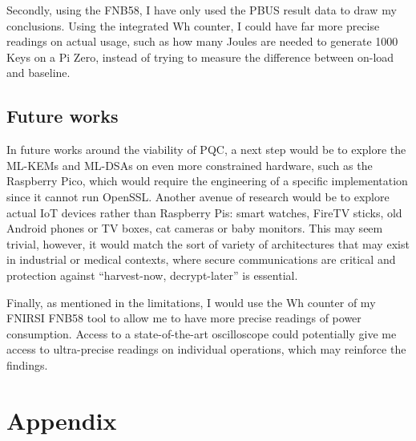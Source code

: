 \documentclass[11pt, letterpaper]{article}
\begin{document}
Secondly, using the FNB58, I have only used the PBUS result data to draw my conclusions. Using the integrated Wh counter, I could have far more precise readings on actual usage, such as how many Joules are needed to generate 1000 Keys on a Pi Zero, instead of trying to measure the difference between on-load and baseline. 

\subsection{Future works}
In future works around the viability of PQC, a next step would be to explore the ML-KEMs and ML-DSAs on even more constrained hardware, such as the Raspberry Pico, which would require the engineering of a specific implementation since it cannot run OpenSSL.
Another avenue of research would be to explore actual IoT devices rather than Raspberry Pis: smart watches, FireTV sticks, old Android phones or TV boxes, cat cameras or baby monitors. This may seem trivial, however, it would match the sort of variety of architectures that may exist in industrial or medical contexts, where secure communications are critical and protection against “harvest-now, decrypt-later” is essential. 

Finally, as mentioned in the limitations, I would use the Wh counter of my FNIRSI FNB58 tool to allow me to have more precise readings of power consumption. Access to a state-of-the-art oscilloscope could potentially give me access to ultra-precise readings on individual operations, which may reinforce the findings.



\section{Appendix}
\end{document}

